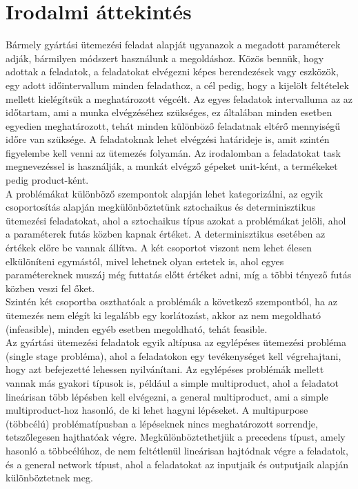 \documentclass {report}
\begin{document}
\chapter{Irodalmi áttekintés}
Bármely gyártási ütemezési feladat alapját ugyanazok a megadott paraméterek adják, bármilyen módszert használunk a megoldáshoz. Közös bennük, hogy adottak a feladatok, a feladatokat elvégezni képes berendezések vagy eszközök, egy adott időintervallum minden feladathoz, a cél pedig, hogy a kijelölt feltételek mellett kielégítsük a meghatározott végcélt. Az egyes feladatok  intervalluma az az  időtartam, ami a munka elvégzéséhez szükséges, ez általában minden esetben egyedien meghatározott, tehát minden különböző feladatnak eltérő mennyiségű időre van szüksége. A feladatoknak lehet elvégzési határideje is, amit szintén figyelembe kell venni az ütemezés folyamán. Az irodalomban a feladatokat task megnevezéssel is használják, a munkát elvégző gépeket unit-ként, a termékeket pedig product-ként. \\
A problémákat különböző szempontok alapján lehet kategorizálni, az egyik csoportosítás alapján megkülönböztetünk sztochaikus és determinisztikus ütemezési feladatokat, ahol a sztochaikus típus azokat a problémákat jelöli, ahol a paraméterek futás közben kapnak értéket. A determinisztikus esetében az értékek előre be vannak állítva. A két csoportot viszont nem lehet élesen elkülöníteni egymástól, mivel lehetnek olyan estetek is, ahol egyes paramétereknek muszáj még futtatás előtt értéket adni, míg a többi tényező futás közben veszi fel őket.\\
Szintén két csoportba oszthatóak a problémák a következő szempontból, ha az ütemezés nem elégít ki legalább egy korlátozást, akkor az nem megoldható (infeasible), minden egyéb esetben megoldható, tehát feasible. \\
Az gyártási ütemezési feladatok egyik altípusa az egylépéses ütemezési probléma (single stage probléma), ahol a feladatokon egy tevékenységet kell végrehajtani, hogy azt befejezetté lehessen nyilvánítani. Az egylépéses problémák mellett vannak más gyakori típusok is, például a simple multiproduct, ahol a feladatot lineárisan több lépésben kell elvégezni, a general multiproduct, ami a simple multiproduct-hoz hasonló, de ki lehet hagyni lépéseket. A multipurpose (többcélú) problématípusban a lépéseknek nincs meghatározott sorrendje, tetszőlegesen hajthatóak végre. Megkülönböztethetjük a precedens típust, amely hasonló a többcélúhoz, de nem feltétlenül lineárisan hajtódnak végre a feladatok, és a general network típust, ahol a feladatokat az inputjaik és outputjaik alapján különböztetnek meg.\\  
\end{document}
